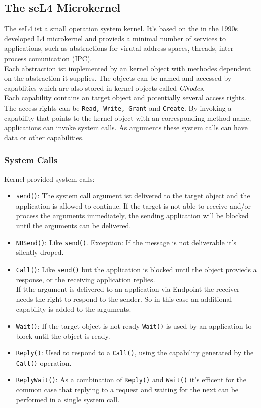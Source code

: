 \documentclass[pdftex,11pt,a4paper,twoside]{article}
\begin{document}
	\subsection{The seL4 Microkernel}\label{sec:seL4}
	The seL4 \cite{Manual} ist a small operation system kernel. It's based on the in the 1990s developed L4 microkernel and provieds a minimal number of services to applications, such as abstractions for virutal address spaces, threads, inter process comunication (IPC). \\
	Each abstraction ist implemented by an kernel object with methodes dependent on the abstraction it supplies. The objects can be named and accessed by capablities which are also stored in kernel objects called \textit{CNodes}. \\
	Each capability contains an target object and potentially several access rights. The access rights can be \texttt{Read, Write, Grant} and \texttt{Create}. By invoking a capability that points to the kernel object  with an corresponding method name, applications can invoke system calls. As arguments these system calls can have data or other capabilities. 
	\subsubsection{System Calls}
	Kernel provided system calls: \\
	\begin{itemize}
	\item \texttt{send()}: The system call argument ist delivered to the target object and the application is allowed to continue. If the target is not able to receive and/or process the arguments immediately, the sending application will be blocked until the arguments can be delivered.
	\item \texttt{NBSend()}: Like \texttt{send()}. Exception: If the message is not deliverable it's silently droped.
	\item \texttt{Call()}: Like \texttt{send()} but the application is blocked until the object provieds a response, or the receiving application replies. \\
	If tthe argument is delivered to an application via Endpoint the receiver needs the right to respond to the sender. So in this case an additional capability is added to the arguments. 
	\item \texttt{Wait()}: If the target object is not ready \texttt{Wait()} is used by an application to block until the object is ready. 
	\item \texttt{Reply()}: Used to respond to a \texttt{Call()}, using the capability generated by the \texttt{Call()} operation.
	\item \texttt{ReplyWait()}: As a combination of \texttt{Reply()} and \texttt{Wait()} it's efficent for the common case that replying to a request and waiting for the next can be performed in a single system call. 
	\end{itemize}
	\newpage
\end{document}
